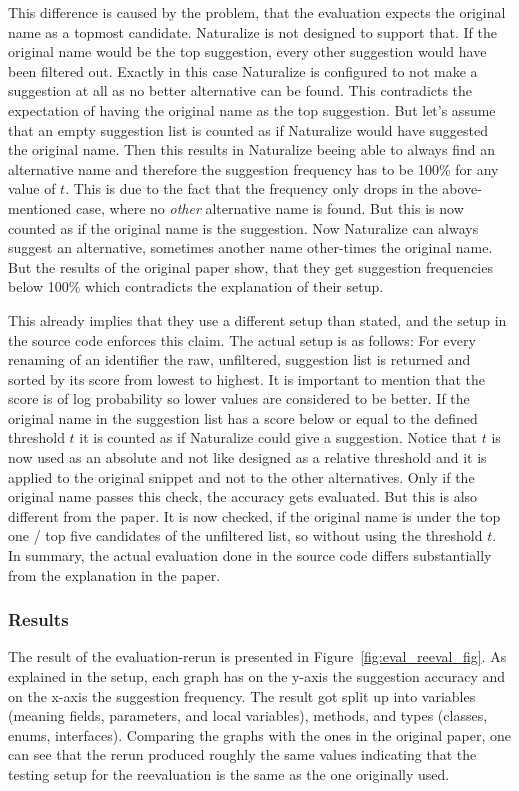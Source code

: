 This difference is caused by the problem, that the evaluation expects the original name as a topmost candidate. Naturalize is not designed to support that. If the original name would be the top suggestion, every other suggestion would have been filtered out. Exactly in this case Naturalize is configured to not make a suggestion at all as no better alternative can be found. This contradicts the expectation of having the original name as the top suggestion. But let's assume that an empty suggestion list is counted as if Naturalize would have suggested the original name. Then this results in Naturalize beeing able to always find an alternative name and therefore the suggestion frequency has to be 100\% for any value of $t$. This is due to the fact that the frequency only drops in the above-mentioned case, where no \emph{other} alternative name is found. But this is now counted as if the original name is the suggestion. Now Naturalize can always suggest an alternative, sometimes another name other-times the original name. But the results of the original paper show, that they get suggestion frequencies below 100\% which contradicts the explanation of their setup.

This already implies that they use a different setup than stated, and the setup in the source code enforces this claim. The actual setup is as follows:
For every renaming of an identifier the raw, unfiltered, suggestion list is returned and sorted by its score from lowest to highest. It is important to mention that the score is of log probability so lower values are considered to be better. If the original name in the suggestion list has a score below or equal to the defined threshold $t$ it is counted as if Naturalize could give a suggestion. Notice that $t$ is now used as an absolute and not like designed as a relative threshold and it is applied to the original snippet and not to the other alternatives. Only if the original name passes this check, the accuracy gets evaluated. But this is also different from the paper. It is now checked, if the original name is under the top one / top five candidates of the unfiltered list, so without using the threshold $t$. In summary, the actual evaluation done in the source code differs substantially from the explanation in the paper. 

\subsubsection{Results}

The result of the evaluation-rerun is presented in Figure~\ref{fig:eval_reeval_fig}.
As explained in the setup, each graph has on the y-axis the suggestion accuracy and on the x-axis the suggestion frequency. The result got split up into variables (meaning fields, parameters, and local variables), methods, and types (classes, enums, interfaces). Comparing the graphs with the ones in the original paper, one can see that the rerun produced roughly the same values indicating that the testing setup for the reevaluation is the same as the one originally used. 

